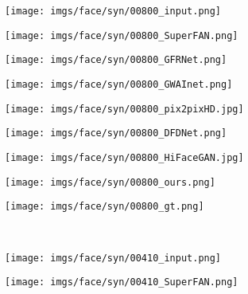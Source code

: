 \documentclass[final]{cvpr}
\begin{document}
\begin{figure*}[ht!]
\centering
\begin{subfigure}[t!]{.11\textwidth}
        \texttt{[image: imgs/face/syn/00800\_input.png]}
    \end{subfigure}\begin{subfigure}[t!]{.11\textwidth}
        \texttt{[image: imgs/face/syn/00800\_SuperFAN.png]}
    \end{subfigure}\begin{subfigure}[t!]{.11\textwidth}
        \texttt{[image: imgs/face/syn/00800\_GFRNet.png]}
    \end{subfigure}\begin{subfigure}[t!]{.11\textwidth}
        \texttt{[image: imgs/face/syn/00800\_GWAInet.png]}
    \end{subfigure}\begin{subfigure}[t!]{.11\textwidth}
        \texttt{[image: imgs/face/syn/00800\_pix2pixHD.jpg]}
    \end{subfigure}\begin{subfigure}[t!]{.11\textwidth}
        \texttt{[image: imgs/face/syn/00800\_DFDNet.png]}
    \end{subfigure}\begin{subfigure}[t!]{.11\textwidth}
        \texttt{[image: imgs/face/syn/00800\_HiFaceGAN.jpg]}
    \end{subfigure}\begin{subfigure}[t!]{.11\textwidth}
        \texttt{[image: imgs/face/syn/00800\_ours.png]}
    \end{subfigure}\begin{subfigure}[t!]{.11\textwidth}
        \texttt{[image: imgs/face/syn/00800\_gt.png]}
    \end{subfigure}\\
    \begin{subfigure}[t!]{.11\textwidth}
        \texttt{[image: imgs/face/syn/00410\_input.png]}
        \vspace*{-5mm}
        \caption{}
    \end{subfigure}\begin{subfigure}[t!]{.11\textwidth}
        \texttt{[image: imgs/face/syn/00410\_SuperFAN.png]}
        \vspace*{-5mm}
        \caption{}
    \end{subfigure}\begin{subfigure}[t!]{.11\textwidth}

\end{subfigure}
\end{figure*}
\end{document}
